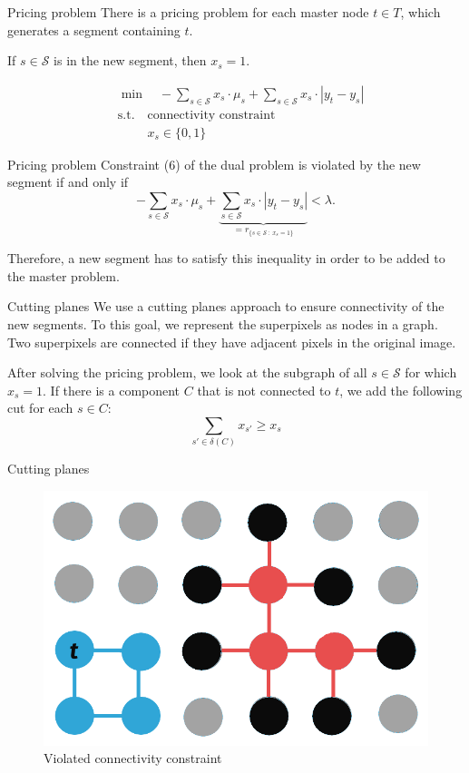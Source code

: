 \documentclass[fleqn]{beamer}
\newcommand{\superpixels}{\mathcal{S}}
\begin{document}
	\begin{frame}{Pricing problem}
		There is a pricing problem for each master node $t\in T$,
		which generates a segment containing $t$.
		
		If $s\in\superpixels$ is in the new segment, then $x_s=1$.		
		 
		\begin{align}
    		&\min\quad -\sum_{s\in\superpixels} x_s\cdot\mu_s + \sum_{s\in\superpixels} x_s\cdot|y_t-y_s| \\
    		&\text{s.t.}\quad \text{connectivity constraint} \\
	    	&\phantom{\text{s.t.}\quad} x_s \in\{0,1\}
		\end{align}
	\end{frame}
	
	\begin{frame}{Pricing problem}
		Constraint (6) of the dual problem is violated by the new segment if and only if
		\[-\sum_{s\in\superpixels} x_s\cdot\mu_s + \underbrace{\sum_{s\in\superpixels} x_s\cdot|y_t-y_s|}_{=r_{\{s\in\superpixels\ :\ x_s=1\}}} < \lambda.\]
        
		Therefore, a new segment has to satisfy this inequality in order to be added to the master problem.
	\end{frame}
    
	\begin{frame}{Cutting planes}
		We use a cutting planes approach to ensure connectivity of the new segments.
        To this goal, we represent the superpixels as nodes in a graph.
        Two superpixels are connected if they have adjacent pixels in the original image.
		
		After solving the pricing problem,
		we look at the subgraph of all $s\in\superpixels$ for which $x_s=1$.
		If there is a component $C$ that is not connected to $t$,
		we add the following cut for each $s\in C$:
		\[\sum_{s'\in\delta(C)}x_{s'} \geq x_s\]
	\end{frame}

	\begin{frame}{Cutting planes}
		\begin{figure}
			\centering
			\includegraphics[scale=.3]{cuttingplanes.png}
			\caption{Violated connectivity constraint}
		\end{figure}
	\end{frame}
	
\end{document}
